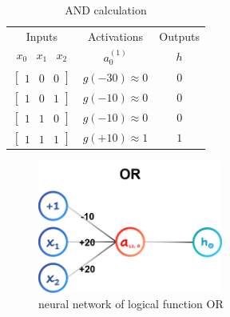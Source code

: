 \begin{itemize}
    \begin{table}[H]
        \renewcommand\arraystretch{1.5}
        \caption{AND calculation}
        \centering
        \begin{tabular}{ccc}
            \hline\hline %
            Inputs                                                     & Activations        & Outputs    \\ 
            $\begin{array}{ccc} x_0 & x_1 & x_2 \end{array}$           & $a^{(1)}_0$        & $h$        \\ 
            \hline %
            $\left[{\begin{array}{ccc} 1 & 0 & 0 \end{array}}\right]$  & $g(-30) \approx 0$ & $0$        \\ 
            $\left[{\begin{array}{ccc} 1 & 0 & 1 \end{array}}\right]$  & $g(-10) \approx 0$ & $0$        \\
            $\left[{\begin{array}{ccc} 1 & 1 & 0 \end{array}}\right]$  & $g(-10) \approx 0$ & $0$        \\
            $\left[{\begin{array}{ccc} 1 & 1 & 1 \end{array}}\right]$  & $g(+10) \approx 1$ & $1$        \\[1ex]
            \hline\hline %
        \end{tabular}
    \end{table}

    \begin{figure}[H]
        \centering
        \includegraphics[width=2.4in]{./images/logicGate_OR.png}
        \caption{neural network of logical function OR}
    \end{figure}


\end{itemize}
